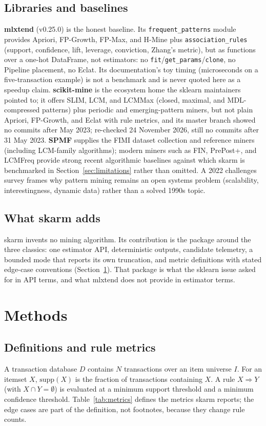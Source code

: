 \documentclass[journal,a4paper]{IEEEtran}
\newcommand{\skarm}{skarm\xspace}
\begin{document}
\subsection{Libraries and baselines}
\textbf{mlxtend} (v0.25.0) \cite{mlxtend} is the honest baseline. Its
\texttt{frequent\_patterns} module provides Apriori, FP-Growth, FP-Max,
and H-Mine plus \texttt{association\_rules} (support, confidence,
lift, leverage, conviction, Zhang's metric), but as functions over a
one-hot DataFrame, not estimators: no
\texttt{fit}/\texttt{get\_params}/\texttt{clone}, no Pipeline
placement, no Eclat. Its documentation's toy timing (microseconds on a
five-transaction example) is not a benchmark and is never quoted here
as a speedup claim. \textbf{scikit-mine} \cite{scikitmine} is the
ecosystem home the sklearn maintainers pointed to; it offers SLIM,
LCM, and LCMMax (closed, maximal, and MDL-compressed patterns) plus
periodic and emerging-pattern miners, but not plain Apriori, FP-Growth,
and Eclat with rule metrics, and its master branch showed no commits
after May 2023; re-checked 24 November 2026, still no commits after 31 May 2023.
\textbf{SPMF} \cite{spmf} supplies the FIMI dataset collection and
reference miners (including LCM-family algorithms); modern miners such
as FIN, PrePost+, and LCMFreq \cite{kallay2025} provide strong recent
algorithmic baselines against which \skarm is benchmarked in
Section~\ref{sec:limitations} rather than omitted. A 2022
challenges survey \cite{fournier2022} frames why pattern mining
remains an open systems problem (scalability, interestingness, dynamic
data) rather than a solved 1990s topic.

\subsection{What \skarm adds}
\skarm invents no mining algorithm. Its contribution is the package
around the three classics: one estimator API, deterministic outputs,
candidate telemetry, a bounded mode that reports its own truncation,
and metric definitions with stated edge-case conventions
(Section~\ref{sec:methods}). That package is what the sklearn issue
asked for in API terms, and what mlxtend does not provide in estimator
terms.

\section{Methods}
\label{sec:methods}

\subsection{Definitions and rule metrics}
A transaction database $D$ contains $N$ transactions over an item
universe $I$. For an itemset $X$, $\mathrm{supp}(X)$ is the fraction of
transactions containing $X$. A rule $X \Rightarrow Y$ (with $X \cap Y =
\emptyset$) is evaluated at a minimum support threshold and a minimum
confidence threshold. Table~\ref{tab:metrics} defines the metrics
\skarm reports; the edge cases are part of the definition, not footnotes,
because they change rule counts.
\end{document}
